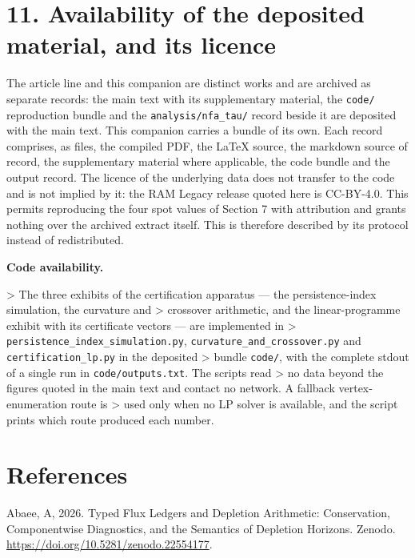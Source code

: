 \documentclass[11pt]{article}
\begin{document}
\vspace{0.8em}

\section*{11. Availability of the deposited material, and its licence}\label{11-availability-of-the-deposited-material-and-its-licence}

The article line and this companion are distinct works and are archived as separate records: the main text with its supplementary material, the \texttt{code/} reproduction bundle and the \texttt{analysis/\allowbreak{}nfa\_tau/} record beside it are deposited with the main text. This companion carries a bundle of its own. Each record comprises, as files, the compiled PDF, the LaTeX source, the markdown source of record, the supplementary material where applicable, the code bundle and the output record. The licence of the underlying data does not transfer to the code and is not implied by it: the RAM Legacy release quoted here is CC-BY-4.0. This permits reproducing the four spot values of Section 7 with attribution and grants nothing over the archived extract itself. This is therefore described by its protocol instead of redistributed.

\textbf{Code availability.}

> The three exhibits of the certification apparatus --- the persistence-index simulation, the curvature and > crossover arithmetic, and the linear-programme exhibit with its certificate vectors --- are implemented in > \texttt{persistence\_\allowbreak{}index\_simula\allowbreak{}tion.\allowbreak{}py}, \texttt{curvature\_an\allowbreak{}d\_crossover.\allowbreak{}py} and \texttt{certificatio\allowbreak{}n\_lp.\allowbreak{}py} in the deposited > bundle \texttt{code/}, with the complete stdout of a single run in \texttt{code/\allowbreak{}outputs.\allowbreak{}txt}. The scripts read > no data beyond the figures quoted in the main text and contact no network. A fallback vertex-enumeration route is > used only when no LP solver is available, and the script prints which route produced each number.

\vspace{0.8em}

\section*{References}\label{references}

Abaee, A, 2026. Typed Flux Ledgers and Depletion Arithmetic: Conservation, Componentwise Diagnostics, and the Semantics of Depletion Horizons. Zenodo. \url{https://doi.org/10.5281/zenodo.22554177}.
\end{document}
